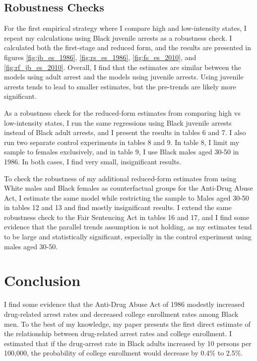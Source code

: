 \documentclass{article}
\begin{document}
\subsection{Robustness Checks} %

For the first empirical strategy where I compare high and low-intensity states, I repeat my calculations using Black juvenile arrests as a robustness check. I calculated both the first-stage and reduced form, and the results are presented in figures \ref{fig:jb_es_1986}, \ref{fig:rs_es_1986}, \ref{fig:fs_es_2010}, and \ref{fig:rf_jb_es_2010}. Overall, I find that the estimates are similar between the models using adult arrest and the models using juvenile arrests. Using juvenile arrests tends to lead to smaller estimates, but the pre-trends are likely more significant. 

As a robustness check for the reduced-form estimates from comparing high vs low-intensity states, I run the same regressions using Black juvenile arrests instead of Black adult arrests, and I present the results in tables 6 and 7. I also run two separate control experiments in tables 8 and 9. In table 8, I limit my sample to females exclusively, and in table 9, I use Black males aged 30-50 in 1986. In both cases, I find very small, insignificant results.

To check the robustness of my additional reduced-form estimates from using White males and Black females as counterfactual groups for the Anti-Drug Abuse Act, I estimate the same model while restricting the sample to Males aged 30-50 in tables 12 and 13 and find mostly insignificant results. I extend the same robustness check to the Fair Sentencing Act in tables 16 and 17, and I find some evidence that the parallel trends assumption is not holding, as my estimates tend to be large and statistically significant, especially in the control experiment using males aged 30-50.


\section{Conclusion}

I find some evidence that the Anti-Drug Abuse Act of 1986 modestly increased drug-related arrest rates and decreased college enrollment rates among Black men. To the best of my knowledge, my paper presents the first direct estimate of the relationship between drug-related arrest rates and college enrollment. I estimated that if the drug-arrest rate in Black adults increased by 10 persons per 100,000, the probability of college enrollment would decrease by 0.4\% to 2.5\%. 
\end{document}
